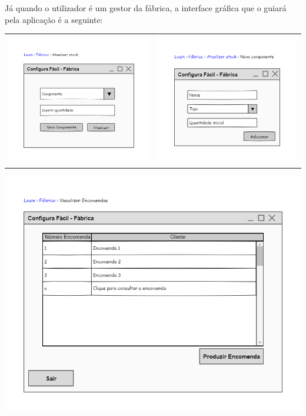 Já quando o utilizador é um gestor da fábrica, a interface gráfica que o guiará pela aplicação é a seguinte:
\begin{center}
	\begin{table}[!htbp]
		\begin{tabular}{cc}
 			\includegraphics[width = 3in]{Prototipagem/atualizar_stock.png} & \includegraphics[width = 3in]{Prototipagem/nova_componente.png}
		\end{tabular}
	\end{table}

 	\includegraphics[width = 5.5in]{Prototipagem/visualizar_encomendas.png}

\end{center}

